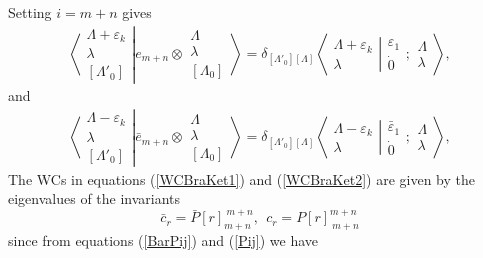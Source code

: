 \documentclass[12pt]{article}
\begin{document}
Setting $i=m+n$ gives
\begin{align}
\left\langle\left. 
\begin{array}{c} \Lambda+\varepsilon_k\\ \lambda \\ {[\Lambda'_0]} \end{array}
\right|\right.
\left.
e_{m+n} \otimes \begin{array}{c} \Lambda \\ \lambda \\
{[\Lambda_0]} \end{array}
\right\rangle = \delta_{[\Lambda'_0][\Lambda]}
 \left\langle\left. 
\begin{array}{c} \Lambda+\varepsilon_k\\ \lambda \end{array}
\right|\right.
\left.
\begin{array}{c} 
\varepsilon_1 \\ \dot{0}
\end{array}
;
\begin{array}{c} \Lambda \\
\lambda \end{array}
\right\rangle  , \label{WCBraKet1}
\end{align}
and
\begin{align}
\left\langle\left. 
\begin{array}{c} \Lambda-\varepsilon_k\\ \lambda \\ {[\Lambda'_0]} \end{array}
\right|\right.
\left.
\bar{e}_{m+n} \otimes \begin{array}{c} \Lambda \\ \lambda \\
{[\Lambda_0]} \end{array}
\right\rangle = \delta_{[\Lambda'_0][\Lambda]}
 \left\langle\left. 
\begin{array}{c} \Lambda-\varepsilon_k\\ \lambda \end{array}
\right|\right.
\left.
\begin{array}{c} 
\bar{\varepsilon}_1 \\ \dot{0}
\end{array}
;
\begin{array}{c} \Lambda \\
\lambda \end{array}
\right\rangle  , \label{WCBraKet2}
\end{align}
The WCs in equations (\ref{WCBraKet1}) and (\ref{WCBraKet2}) are given by the eigenvalues of the invariants
$$ 
\bar{c}_r = \bar{P}[r]_{m+n}^{\ m+n}, ~~c_r = P[r]_{\ m+n}^{m+n}
$$
since from equations (\ref{BarPij}) and (\ref{Pij}) we have
\end{document}
